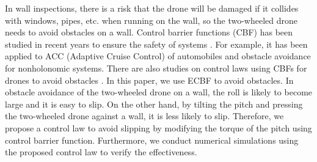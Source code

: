 In wall inspections, there is a risk that the drone will be damaged if it collides with windows, pipes, etc. when running on the wall, so the two-wheeled drone needs to avoid obstacles on a wall.
Control barrier functions (CBF) has been studied in recent years to ensure the safety of systems \cite{amesControlBarrierFunction2017, amesControlBarrierFunctions2019a, huangGuaranteedVehicleSafety2019, liSurveyControlLyapunov2023}.
For example, it has been applied to ACC (Adaptive Cruise Control) of automobiles \cite{amesControlBarrierFunction2014, xiaoControlBarrierFunctions2019} and obstacle avoidance for nonholonomic systems\cite{desaiCLFCBFBasedQuadratic2022, marleySynergisticControlBarrier2021}.
There are also studies on control laws using CBFs for drones to avoid obstacles \cite{khanBarrierFunctionsCascaded2020, wuSafetycriticalControlPlanar2016}.
In this paper, we use ECBF to avoid obstacles.
In obstacle avoidance of the two-wheeled drone on a wall, the roll is likely to become large and it is easy to slip.
On the other hand, by tilting the pitch and pressing the two-wheeled drone against a wall, it is less likely to slip.
Therefore, we propose a control law to avoid slipping by modifying the torque of the pitch using control barrier function.
Furthermore, we conduct numerical simulations using the proposed control law to verify the effectiveness.
